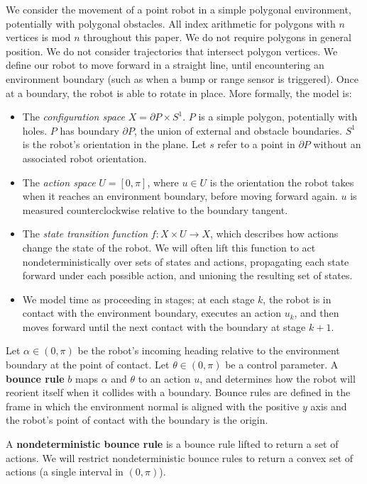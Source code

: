 \documentclass[]{styles/svproc}  %
\begin{document}
We consider the movement of a point robot in a simple polygonal environment,
potentially with polygonal obstacles. All index arithmetic for polygons with $n$ vertices is mod $n$ 
throughout this paper. We do not require polygons in general position. We do
not consider trajectories that intersect polygon vertices. We define our robot to move forward in a straight line, until
encountering an environment boundary (such as when a bump or range sensor is
triggered). Once at a boundary, the robot is able to rotate in place. More formally, the model is:
\begin{itemize}
\item The \emph{configuration space} $X = \partial P \times S^1$. $P$ is a simple polygon,
potentially with holes. $P$ has boundary $\partial P$, the union of external
and obstacle boundaries. $S^1$ is the robot's orientation in the plane. Let $s$ refer to a point in $\partial P$ without an associated robot orientation.
\item The \emph{action space} $U = [0,\pi]$, where $u \in U$ is the
orientation the robot takes when it reaches an environment boundary, before
moving forward again. $u$ is measured counterclockwise
relative to the boundary tangent. 
\item The \emph{state transition function} $f: X \times U \to X$, which
describes how actions change the state of the robot. We will often lift this function to act nondeterministically over sets
of states and actions, propagating each state forward under each possible action,
and unioning the resulting set of states. 
\item We model time as proceeding in stages; at each stage $k$, the robot
is in contact with the environment boundary, executes an action $u_k$, and then
moves forward until the next contact with the boundary at stage $k+1$.
\end{itemize}


\begin{definition}
Let $\alpha \in (0,\pi)$ be the robot's incoming heading relative to the
environment boundary at the point of contact. Let $\theta \in (0,\pi)$ be a control parameter. A 
\textbf{bounce rule} $b$ maps $\alpha$ and $\theta$ to an action
$u$, and determines how the robot will reorient itself when it collides with a
boundary. Bounce rules are defined in the
frame in which the environment normal is aligned with the positive $y$ axis and the
robot's point of contact with the boundary is the origin.
\end{definition}
\begin{definition}
A \textbf{nondeterministic bounce rule} is a bounce rule lifted to return a set of actions. 
We will restrict nondeterministic bounce rules to
return a convex set of actions (a single interval in $(0, \pi)$).
\end{definition}
\end{document}
